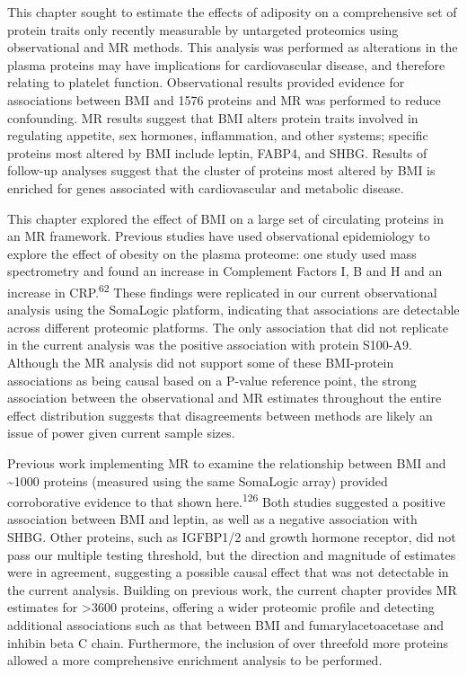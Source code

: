 \documentclass[11pt,twoside]{bristolthesis}
\begin{document}
This chapter sought to estimate the effects of adiposity on a comprehensive set of protein traits only recently measurable by untargeted proteomics using observational and MR methods. This analysis was performed as alterations in the plasma proteins may have implications for cardiovascular disease, and therefore relating to platelet function. Observational results provided evidence for associations between BMI and 1576 proteins and MR was performed to reduce confounding. MR results suggest that BMI alters protein traits involved in regulating appetite, sex hormones, inflammation, and other systems; specific proteins most altered by BMI include leptin, FABP4, and SHBG. Results of follow-up analyses suggest that the cluster of proteins most altered by BMI is enriched for genes associated with cardiovascular and metabolic disease.

This chapter explored the effect of BMI on a large set of circulating proteins in an MR framework. Previous studies have used observational epidemiology to explore the effect of obesity on the plasma proteome: one study used mass spectrometry and found an increase in Complement Factors I, B and H and an increase in CRP.\textsuperscript{62} These findings were replicated in our current observational analysis using the SomaLogic platform, indicating that associations are detectable across different proteomic platforms. The only association that did not replicate in the current analysis was the positive association with protein S100-A9. Although the MR analysis did not support some of these BMI-protein associations as being causal based on a P-value reference point, the strong association between the observational and MR estimates throughout the entire effect distribution suggests that disagreements between methods are likely an issue of power given current sample sizes.

Previous work implementing MR to examine the relationship between BMI and \textasciitilde1000 proteins (measured using the same SomaLogic array) provided corroborative evidence to that shown here.\textsuperscript{126} Both studies suggested a positive association between BMI and leptin, as well as a negative association with SHBG. Other proteins, such as IGFBP1/2 and growth hormone receptor, did not pass our multiple testing threshold, but the direction and magnitude of estimates were in agreement, suggesting a possible causal effect that was not detectable in the current analysis. Building on previous work, the current chapter provides MR estimates for \textgreater3600 proteins, offering a wider proteomic profile and detecting additional associations such as that between BMI and fumarylacetoacetase and inhibin beta C chain. Furthermore, the inclusion of over threefold more proteins allowed a more comprehensive enrichment analysis to be performed.
\end{document}
